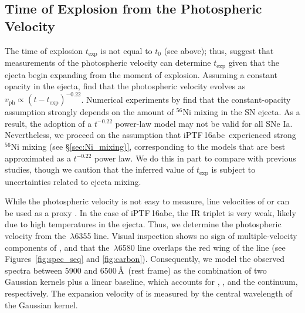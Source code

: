 \documentclass[twocolumn]{aastex61}
\newcommand{\abc}{iPTF\,16abc}
\begin{document}
\subsection{Time of Explosion from the Photospheric Velocity}
\label{sec:early_vel}

The time of explosion $t_\mathrm{exp}$ is not equal to $t_0$ (see above);
thus, \citet{2014ApJ...784...85P} suggest that measurements of the
photospheric velocity can determine $t_\mathrm{exp}$ given that the ejecta
begin expanding from the moment of explosion. Assuming a constant opacity in
the ejecta, \citeauthor{2014ApJ...784...85P} find that the photospheric
velocity evolves as $v_\mathrm{ph}\propto(t-t_\mathrm{exp})^{-0.22}$.
Numerical experiments by \citet{2016ApJ...826...96P} find that the
constant-opacity assumption strongly depends on the amount of $^{56}$Ni
mixing in the SN ejecta. As a result, the adoption of a $t^{-0.22}$
power-law model may not be valid for all SNe Ia. Nevertheless, we proceed on
the assumption that \abc\ experienced strong $^{56}$Ni mixing (see
\S\ref{sec:Ni_mixing)}, corresponding to the models that are best
approximated as a $t^{-0.22}$ power law. We do this in part to compare with
previous studies, though we caution that the inferred value of
$t_\mathrm{exp}$ is subject to uncertainties related to ejecta mixing.

While the photospheric velocity is not easy to measure, line velocities of
 or  can be used as a proxy
\citep{2014ApJ...784...85P,2016ApJ...826..144S}. In the case of \abc, the
 IR triplet is very weak, likely due to high temperatures in the
ejecta. Thus, we determine the photospheric velocity from the
\,$\lambda$6355 line. Visual inspection shows no sign of
multiple-velocity components of , and that the
\,$\lambda$6580 line overlaps the red wing of the  line
(see Figures~\ref{fig:spec_seq} and \ref{fig:carbon}). Consequently, we model
the observed spectra between 5900 and 6500\,\AA\ (rest frame) as the
combination of two Gaussian kernels plus a linear baseline, which accounts for
, , and the continuum, respectively. The expansion
velocity of  is measured by the central wavelength of the
 Gaussian kernel.
\end{document}
